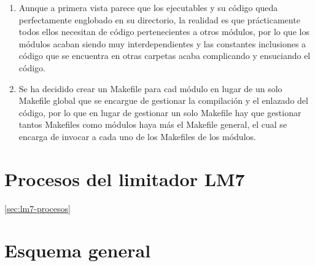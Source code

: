 \begin{enumerate}
    \item Aunque a primera vista parece que los ejecutables y su código queda perfectamente englobado en su directorio, la realidad es que prácticamente todos ellos necesitan de código pertenecientes a otros módulos, por lo que los módulos acaban siendo muy interdependientes y las constantes inclusiones a código que se encuentra en otras carpetas acaba complicando y ensuciando el código.

    \item Se ha decidido crear un Makefile para cad módulo en lugar de un solo Makefile global que se encargue de gestionar la compilación y el enlazado del código, por lo que en lugar de gestionar un solo Makefile hay que gestionar tantos Makefiles como módulos haya más el Makefile general, el cual se encarga de invocar a cada uno de los Makefiles de los módulos.
\end{enumerate}

\section{Procesos del limitador LM7} \ref{sec:lm7-procesos}



\section{Esquema general}

%
%
%

